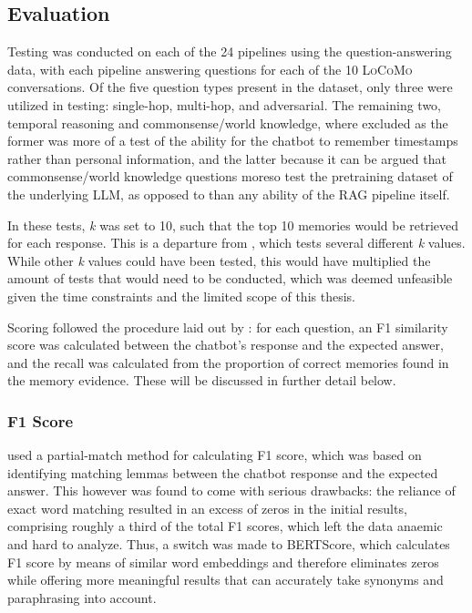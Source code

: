 
\subsection{Evaluation}

Testing was conducted on each of the 24 pipelines using the question-answering data, with each pipeline answering questions for each of the 10 \textsc{LoCoMo} conversations. Of the five question types present in the dataset, only three were utilized in testing: single-hop, multi-hop, and adversarial. The remaining two, temporal reasoning and commonsense/world knowledge, where excluded as the former was more of a test of the ability for the chatbot to remember timestamps rather than personal information, and the latter because it can be argued that commonsense/world knowledge questions moreso test the pretraining dataset of the underlying LLM, as opposed to than any ability of the RAG pipeline itself. 

In these tests, \textit{k} was set to 10, such that the top 10 memories would be retrieved for each response. This is a departure from \cite{Maharana2024}, which tests several different \textit{k} values. While other \textit{k} values could have been tested, this would have multiplied the amount of tests that would need to be conducted, which was deemed unfeasible given the time constraints and the limited scope of this thesis.

Scoring followed the procedure laid out by \cite{Maharana2024}: for each question, an F1 similarity score was calculated between the chatbot's response and the expected answer, and the recall was calculated from the proportion of correct memories found in the memory evidence. These will be discussed in further detail below.


\subsubsection{F1 Score}

\cite{Maharana2024} used a partial-match method for calculating F1 score, which was based on identifying matching lemmas between the chatbot response and the expected answer. This however was found to come with serious drawbacks: the reliance of exact word matching resulted in an excess of zeros in the initial results, comprising roughly a third of the total F1 scores, which left the data anaemic and hard to analyze. Thus, a switch was made to BERTScore, which calculates F1 score by means of similar word embeddings and therefore eliminates zeros while offering more meaningful results that can accurately take synonyms and paraphrasing into account. 



